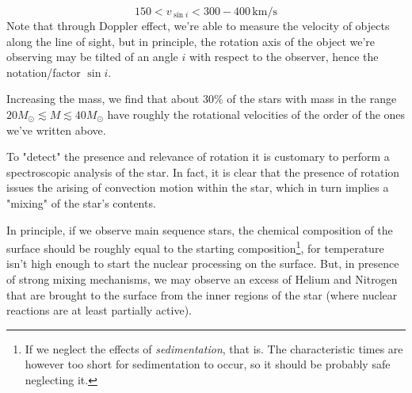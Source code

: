 \begin{equation*}
	150 < v_{\sin i} < 300-400\,\text{km}/\text{s}
\end{equation*}
Note that through Doppler effect, we're able to measure the velocity of objects along the line of sight, but in principle, the rotation axis of the object we're observing may be tilted of an angle $i$ with respect to the observer, hence the notation/factor $\sin i$.
\par Increasing the mass, we find that about $30\%$ of the stars with mass in the range $20M_{\odot}\lesssim M \lesssim 40M_{\odot}$ have roughly the rotational velocities of the order of the ones we've written above.
\par To "detect" the presence and relevance of rotation it is customary to perform a spectroscopic analysis of the star. In fact, it is clear that the presence of rotation issues the arising of convection motion within the star, which in turn implies a "mixing" of the star's contents.
\par In principle, if we observe main sequence stars, the chemical composition of the surface should be roughly equal to the starting composition\footnote{If we neglect the effects of \emph{sedimentation}, that is. The characteristic times are however too short for sedimentation to occur, so it should be probably safe neglecting it.}, for temperature isn't high enough to start the nuclear processing on the surface. But, in presence of strong mixing mechanisms, we may observe an excess of Helium and Nitrogen that are brought to the surface from the inner regions of the star (where nuclear reactions are at least partially active).

